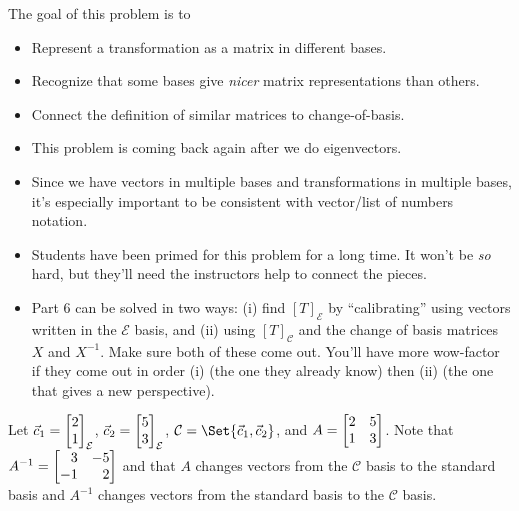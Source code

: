 	\bookonlynewpage
	\question
	\begin{annotation}
		\begin{goals}

			The goal of this problem is to
			\begin{itemize}
				\item Represent a transformation as a matrix in different bases.
				\item Recognize that some bases give \emph{nicer} matrix representations
					than others.
				\item Connect the definition of similar matrices to change-of-basis.
			\end{itemize}
		\end{goals}

		\begin{notes}
			\begin{itemize}
				\item This problem is coming back again after we do eigenvectors.
				\item Since we have vectors in multiple bases and transformations in
					multiple bases, it's especially important to be consistent
					with vector/list of numbers notation.
				\item Students have been primed for this problem for a long time. It won't
					be \emph{so} hard, but they'll need the instructors help to connect the
					pieces.
				\item Part 6 can be solved in two ways: (i) find $[T]_{\mathcal E}$ by ``calibrating''
					using vectors written in the $\mathcal E$ basis, and (ii) using $[T]_{\mathcal C}$
					and the change of basis matrices $X$ and $X^{-1}$. Make sure both of these come out.
					You'll have more wow-factor if they come out in order (i) (the one
					they already know) then (ii) (the one that gives a new perspective).
			\end{itemize}
		\end{notes}
	\end{annotation}
	Let $\vec c_1=\mat{2\\1}_{\mathcal E}$, $\vec c_2=\mat{5\\3}_{\mathcal E}$, $\mathcal C=\Set{\vec c_1,\vec c_2}$, and $A=\mat{2&5\\1&3}$.
	Note that $A^{-1}=\mat{3&-5\\-1&2}$ and that $A$ changes vectors from the $\mathcal C$ basis to the standard
	basis and $A^{-1}$ changes vectors from the standard basis to the $\mathcal C$ basis.
